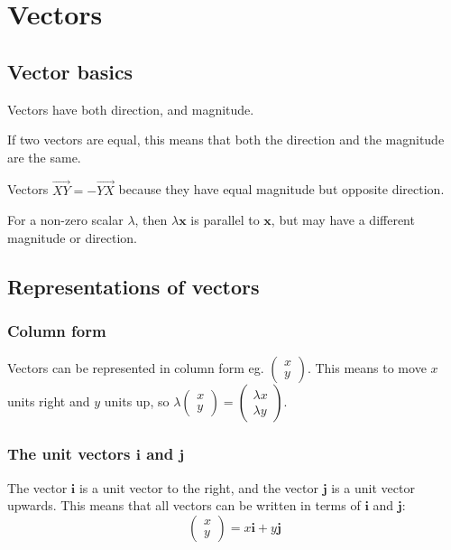 \section{Vectors}
\subsection{Vector basics}
Vectors have both direction, and magnitude.

If two vectors are equal, this means that both the direction and the magnitude are the same.

Vectors $\vec{XY}=-\vec{YX}$ because they have equal magnitude but opposite direction.

For a non-zero scalar $\lambda$, then $\lambda \textbf{x}$ is parallel to $\textbf{x}$, but may have a different magnitude or direction.

\subsection{Representations of vectors}
\subsubsection{Column form}
Vectors can be represented in column form eg. $\begin{pmatrix}x \\ y\end{pmatrix}$. This means to move $x$ units right and $y$ units up, so $\lambda \begin{pmatrix}x \\y\end{pmatrix}=\begin{pmatrix}\lambda x \\ \lambda y\end{pmatrix}$.

\subsubsection{The unit vectors $\textbf{i}$ and $\textbf{j}$}
The vector $\textbf{i}$ is a unit vector to the right, and the vector $\textbf{j}$ is a unit vector upwards. This means that all vectors can be written in terms of $\textbf{i}$ and $\textbf{j}$:
\begin{equation}
	\begin{pmatrix}x \\ y\end{pmatrix}=x\textbf{i}+y\textbf{j}
\end{equation}

